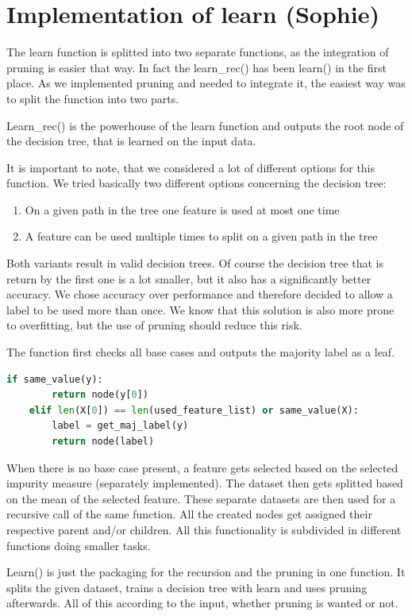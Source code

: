 \documentclass[12pt,a4paper]{scrartcl}		%
\begin{document}
\section{Implementation of learn (Sophie)}
The learn function is splitted into two separate functions, as the integration of pruning is easier that way. 
In fact the learn\_rec() has been learn() in the first place. As we implemented pruning and needed to integrate 
it, the easiest way was to split the function into two parts.

Learn\_rec() is the powerhouse of the learn function and outputs the root node of the decision tree, that is 
learned on the input data. 

It is important to note, that we considered a lot of different options for this function. We tried basically 
two different options concerning the decision tree:
\begin{enumerate}
    \item On a given path in the tree one feature is used at most one time
    \item A feature can be used multiple times to split on a given path in the tree
\end{enumerate}
Both variants result in valid decision trees. Of course the decision tree that is return by the first one is 
a lot smaller, but it also has a significantly better accuracy. We chose accuracy over performance and 
therefore decided to allow a label to be used more than once. We know that this solution is also more prone 
to overfitting, but the use of pruning should reduce this risk.

The function first checks all base cases and outputs the majority label as a leaf.
\begin{lstlisting}[language=Python]
    if same_value(y):
        return node(y[0])
    elif len(X[0]) == len(used_feature_list) or same_value(X):
        label = get_maj_label(y)
        return node(label)
\end{lstlisting}

When there is no base case 
present, a feature gets selected based on the selected impurity measure (separately implemented).
The dataset then gets splitted based on the mean of the selected feature. These separate datasets are then 
used for a recursive call of the same function. All the created nodes get assigned their respective parent 
and/or children.
All this functionality is subdivided in different functions doing smaller tasks.

Learn()  is just the packaging for the recursion and the pruning in one function. It splits the given dataset, 
trains a decision tree with learn and uses pruning afterwards. All of this according to the input, whether 
pruning is wanted or not.
\end{document}
